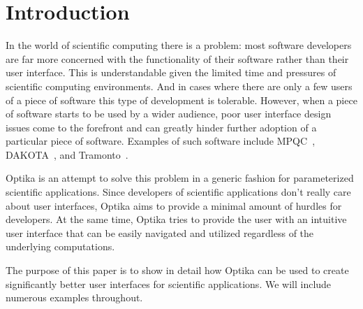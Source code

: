 \section{Introduction}
In the world of scientific computing there is a problem: most software 
developers are far more concerned with the functionality of their software 
rather than their user interface. This is understandable given
the limited time and pressures of scientific computing environments. And in 
cases where there are only a few users of a piece of software this type of 
development is tolerable. However, when a piece of software starts to be used 
by a wider audience, poor user interface design issues come to the forefront 
and can greatly hinder further adoption of a particular piece of software. 
Examples of such software include MPQC~\cite{mpqc}, DAKOTA~\cite{dakota}, and 
Tramonto~\cite{tramonto}.

Optika is an attempt to solve this
problem in a generic fashion for parameterized scientific applications.
Since developers of scientific applications don't really care about user 
interfaces, Optika aims to provide a minimal amount of hurdles for developers. 
At the same time, Optika tries to provide the user with an intuitive user
interface that can be easily navigated and utilized regardless of the 
underlying computations.

The purpose of this paper is to show in detail how Optika can be used to create
significantly better user interfaces for scientific applications. We will include
numerous examples throughout.
